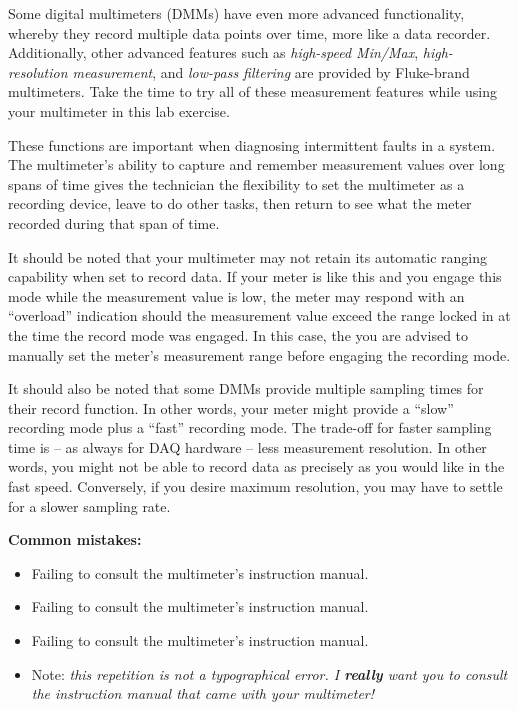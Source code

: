 Some digital multimeters (DMMs) have even more advanced functionality, whereby they record multiple data points over time, more like a data recorder.  Additionally, other advanced features such as {\it high-speed Min/Max}, {\it high-resolution measurement}, and {\it low-pass filtering} are provided by Fluke-brand multimeters.  Take the time to try all of these measurement features while using your multimeter in this lab exercise.

\vskip 10pt

These functions are important when diagnosing intermittent faults in a system.  The multimeter's ability to capture and remember measurement values over long spans of time gives the technician the flexibility to set the multimeter as a recording device, leave to do other tasks, then return to see what the meter recorded during that span of time.

\vskip 10pt

It should be noted that your multimeter may not retain its automatic ranging capability when set to record data.  If your meter is like this and you engage this mode while the measurement value is low, the meter may respond with an ``overload'' indication should the measurement value exceed the range locked in at the time the record mode was engaged.  In this case, the you are advised to manually set the meter's measurement range before engaging the recording mode.

It should also be noted that some DMMs provide multiple sampling times for their record function.  In other words, your meter might provide a ``slow'' recording mode plus a ``fast'' recording mode.  The trade-off for faster sampling time is -- as always for DAQ hardware -- less measurement resolution.  In other words, you might not be able to record data as precisely as you would like in the fast speed.  Conversely, if you desire maximum resolution, you may have to settle for a slower sampling rate.

\vskip 10pt

{\bf Common mistakes:}

\begin{itemize}
\item{} Failing to consult the multimeter's instruction manual.
\item{} Failing to consult the multimeter's instruction manual.
\item{} Failing to consult the multimeter's instruction manual.
\item{} Note: {\it this repetition is not a typographical error.  I {\bf really} want you to consult the instruction manual that came with your multimeter!}
\end{itemize}






